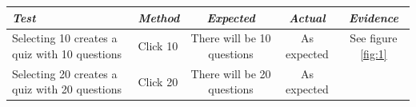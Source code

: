 \documentclass[english,a4paper,]{report}
\begin{document}
\begin{longtable}[]{@{}llccc@{}}
\toprule
\begin{minipage}[b]{0.16\columnwidth}\raggedright\strut
\emph{Test}\strut
\end{minipage} & \begin{minipage}[b]{0.15\columnwidth}\raggedright\strut
\emph{Method}\strut
\end{minipage} & \begin{minipage}[b]{0.19\columnwidth}\centering\strut
\emph{Expected}\strut
\end{minipage} & \begin{minipage}[b]{0.17\columnwidth}\centering\strut
\emph{Actual}\strut
\end{minipage} & \begin{minipage}[b]{0.18\columnwidth}\centering\strut
\emph{Evidence}\strut
\end{minipage}\tabularnewline
\midrule
\endhead
\begin{minipage}[t]{0.16\columnwidth}\raggedright\strut
Selecting 10 creates a quiz with 10 questions\strut
\end{minipage} & \begin{minipage}[t]{0.15\columnwidth}\raggedright\strut
Click 10\strut
\end{minipage} & \begin{minipage}[t]{0.19\columnwidth}\centering\strut
There will be 10 questions\strut
\end{minipage} & \begin{minipage}[t]{0.17\columnwidth}\centering\strut
As expected\strut
\end{minipage} & \begin{minipage}[t]{0.18\columnwidth}\centering\strut
See figure \ref{fig:1}\strut
\end{minipage}\tabularnewline
\begin{minipage}[t]{0.16\columnwidth}\raggedright\strut
Selecting 20 creates a quiz with 20 questions\strut
\end{minipage} & \begin{minipage}[t]{0.15\columnwidth}\raggedright\strut
Click 20\strut
\end{minipage} & \begin{minipage}[t]{0.19\columnwidth}\centering\strut
There will be 20 questions\strut
\end{minipage} & \begin{minipage}[t]{0.17\columnwidth}\centering\strut
As expected\strut
\end{minipage} & \begin{minipage}[t]{0.18\columnwidth}\centering\strut

\end{minipage}
\end{longtable}
\end{document}
